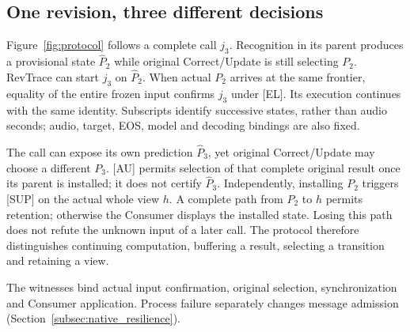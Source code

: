 \subsection{One revision, three different decisions}
Figure~\ref{fig:protocol} follows a complete call $j_3$. Recognition in
its parent produces a provisional state $\widehat P_2$ while original
Correct/Update is still selecting $P_2$. RevTrace can start $j_3$ on
$\widehat P_2$. When actual $P_2$ arrives at the same frontier, equality
of the entire frozen input confirms $j_3$ under [EL]. Its execution
continues with the same identity. Subscripts identify successive states,
rather than audio seconds; audio, target, EOS, model and decoding bindings
are also fixed.

The call can expose its own prediction $\widehat P_3$, yet original
Correct/Update may choose a different $P_3$. [AU] permits selection of
that complete original result once its parent is installed; it does not
certify $\widehat P_3$. Independently, installing $P_2$ triggers [SUP]
on the actual whole view $h$. A complete path from $P_2$ to $h$ permits
retention; otherwise the Consumer displays the installed state. Losing
this path does not refute the unknown input of a later call. The protocol
therefore distinguishes continuing computation, buffering a result,
selecting a transition and retaining a view.

The witnesses bind actual input confirmation, original selection,
synchronization and Consumer application. Process failure separately
changes message admission (Section~\ref{subsec:native_resilience}).

